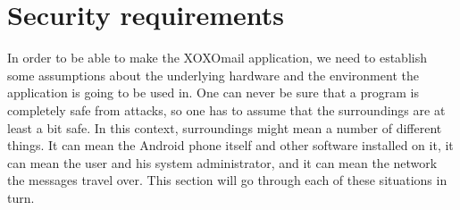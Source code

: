 \section{Security requirements}

In order to be able to make the XOXOmail application, we need to establish some assumptions about the underlying hardware and the environment the application is going to be used in. One can never be sure that a program is completely safe from attacks, so one has to assume that the surroundings are at least a bit safe. In this context, surroundings might mean a number of different things. It can mean the Android phone itself and other software installed on it, it can mean the user and his system administrator, and it can mean the network the messages travel over. This section will go through each of these situations in turn.

